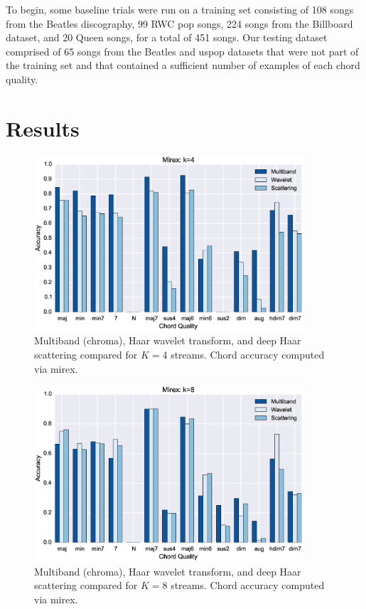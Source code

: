 \documentclass{article}
\begin{document}
To begin, some baseline trials were run on a training set consisting of 108 songs from the Beatles
discography, 99 RWC pop songs, 224 songs from the Billboard dataset, and 20 Queen songs,
for a total of 451 songs.
Our testing dataset comprised of 65 songs from the Beatles and uspop datasets that were not part
of the training set and that contained a sufficient number of examples of each chord quality. 
	
\section{Results}\label{sec:results}

\begin{figure}
 \centerline{
 \includegraphics[width=10cm]{figs/mirex4.eps}}
 \caption{Multiband (chroma), Haar wavelet transform, and deep Haar scattering compared for $K=4$ streams. Chord accuracy computed via mirex.}
 \label{fig:mirex4}
\end{figure}

\begin{figure}
 \centerline{
 \includegraphics[width=10cm]{figs/mirex8.eps}}
 \caption{Multiband (chroma), Haar wavelet transform, and deep Haar scattering compared for $K=8$ streams. Chord accuracy computed via mirex.}
 \label{fig:mirex8}
\end{figure}
\end{document}
